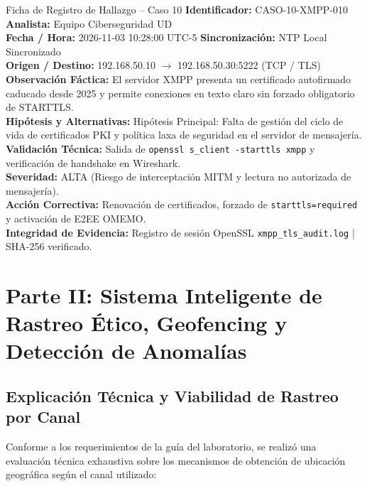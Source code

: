 \documentclass[11pt,letterpaper]{article}
\begin{document}
\begin{hallazgobox}{Ficha de Registro de Hallazgo -- Caso 10}
    \textbf{Identificador:} CASO-10-XMPP-010 \hfill \textbf{Analista:} Equipo Ciberseguridad UD\\
    \textbf{Fecha / Hora:} 2026-11-03 10:28:00 UTC-5 \hfill \textbf{Sincronización:} NTP Local Sincronizado\\
    \textbf{Origen / Destino:} 192.168.50.10 $\rightarrow$ 192.168.50.30:5222 (TCP / TLS)\\
    \textbf{Observación Fáctica:} El servidor XMPP presenta un certificado autofirmado caducado desde 2025 y permite conexiones en texto claro sin forzado obligatorio de STARTTLS.\\
    \textbf{Hipótesis y Alternativas:} Hipótesis Principal: Falta de gestión del ciclo de vida de certificados PKI y política laxa de seguridad en el servidor de mensajería.\\
    \textbf{Validación Técnica:} Salida de \texttt{openssl s\_client -starttls xmpp} y verificación de handshake en Wireshark.\\
    \textbf{Severidad:} ALTA (Riesgo de interceptación MITM y lectura no autorizada de mensajería).\\
    \textbf{Acción Correctiva:} Renovación de certificados, forzado de \texttt{starttls=required} y activación de E2EE OMEMO.\\
    \textbf{Integridad de Evidencia:} Registro de sesión OpenSSL \texttt{xmpp\_tls\_audit.log} | SHA-256 verificado.
\end{hallazgobox}

\newpage
\section{Parte II: Sistema Inteligente de Rastreo Ético, Geofencing y Detección de Anomalías}

\subsection{Explicación Técnica y Viabilidad de Rastreo por Canal}
Conforme a los requerimientos de la guía del laboratorio, se realizó una evaluación técnica exhaustiva sobre los mecanismos de obtención de ubicación geográfica según el canal utilizado:
\end{document}
